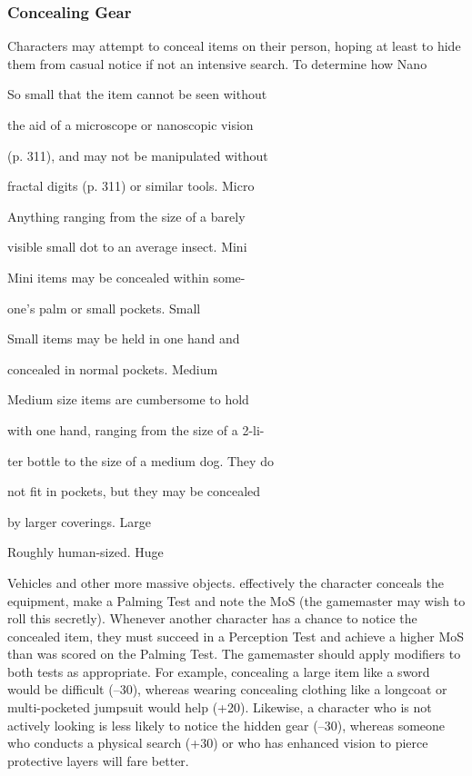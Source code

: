 \subsubsection{Concealing Gear}

Characters may attempt to conceal items on their 
person, hoping at least to hide them from casual 
notice if not an intensive search. To determine how 
Nano

So small that the item cannot be seen without 

the aid of a microscope or nanoscopic vision 

(p. 311), and may not be manipulated without 

fractal digits (p. 311) or similar tools.
Micro

Anything ranging from the size of a barely 

visible small dot to an average insect.
Mini

Mini items may be concealed within some-

one's palm or small pockets.
Small

Small items may be held in one hand and 

concealed in normal pockets.
Medium

Medium size items are cumbersome to hold 

with one hand, ranging from the size of a 2-li-

ter bottle to the size of a medium dog. They do 

not fit in pockets, but they may be concealed 

by larger coverings.
Large

Roughly human-sized.
Huge

Vehicles and other more massive objects.
effectively the character conceals the equipment, make 
a Palming Test and note the MoS (the gamemaster 
may wish to roll this secretly). Whenever another 
character has a chance to notice the concealed item, 
they must succeed in a Perception Test and achieve 
a higher MoS than was scored on the Palming Test. 
The gamemaster should apply modifiers to both tests 
as appropriate. For example, concealing a large item 
like a sword would be difficult (–30), whereas wearing 
concealing clothing like a longcoat or multi-pocketed 
jumpsuit would help (+20). Likewise, a character 
who is not actively looking is less likely to notice the 
hidden gear (–30), whereas someone who conducts a 
physical search (+30) or who has enhanced vision to 
pierce protective layers will fare better.

